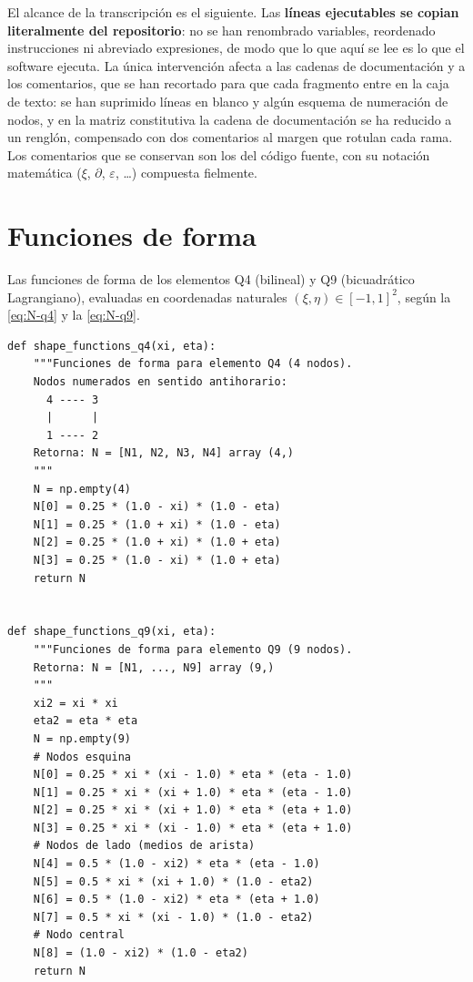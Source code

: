 El alcance de la transcripción es el siguiente. Las \textbf{líneas ejecutables se copian literalmente del repositorio}: no se han renombrado variables, reordenado instrucciones ni abreviado expresiones, de modo que lo que aquí se lee es lo que el software ejecuta. La única intervención afecta a las cadenas de documentación y a los comentarios, que se han recortado para que cada fragmento entre en la caja de texto: se han suprimido líneas en blanco y algún esquema de numeración de nodos, y en la matriz constitutiva la cadena de documentación se ha reducido a un renglón, compensado con dos comentarios al margen que rotulan cada rama. Los comentarios que se conservan son los del código fuente, con su notación matemática ($\xi$, $\partial$, $\varepsilon$, \dots) compuesta fielmente.

\section{Funciones de forma}

Las funciones de forma de los elementos Q4 (bilineal) y Q9 (bicuadrático Lagrangiano), evaluadas en coordenadas naturales $(\xi,\eta) \in [-1,1]^2$, según la \autoref{eq:N-q4} y la \autoref{eq:N-q9}.

\begin{lstlisting}
def shape_functions_q4(xi, eta):
    """Funciones de forma para elemento Q4 (4 nodos).
    Nodos numerados en sentido antihorario:
      4 ---- 3
      |      |
      1 ---- 2
    Retorna: N = [N1, N2, N3, N4] array (4,)
    """
    N = np.empty(4)
    N[0] = 0.25 * (1.0 - xi) * (1.0 - eta)
    N[1] = 0.25 * (1.0 + xi) * (1.0 - eta)
    N[2] = 0.25 * (1.0 + xi) * (1.0 + eta)
    N[3] = 0.25 * (1.0 - xi) * (1.0 + eta)
    return N


def shape_functions_q9(xi, eta):
    """Funciones de forma para elemento Q9 (9 nodos).
    Retorna: N = [N1, ..., N9] array (9,)
    """
    xi2 = xi * xi
    eta2 = eta * eta
    N = np.empty(9)
    # Nodos esquina
    N[0] = 0.25 * xi * (xi - 1.0) * eta * (eta - 1.0)
    N[1] = 0.25 * xi * (xi + 1.0) * eta * (eta - 1.0)
    N[2] = 0.25 * xi * (xi + 1.0) * eta * (eta + 1.0)
    N[3] = 0.25 * xi * (xi - 1.0) * eta * (eta + 1.0)
    # Nodos de lado (medios de arista)
    N[4] = 0.5 * (1.0 - xi2) * eta * (eta - 1.0)
    N[5] = 0.5 * xi * (xi + 1.0) * (1.0 - eta2)
    N[6] = 0.5 * (1.0 - xi2) * eta * (eta + 1.0)
    N[7] = 0.5 * xi * (xi - 1.0) * (1.0 - eta2)
    # Nodo central
    N[8] = (1.0 - xi2) * (1.0 - eta2)
    return N
\end{lstlisting}

